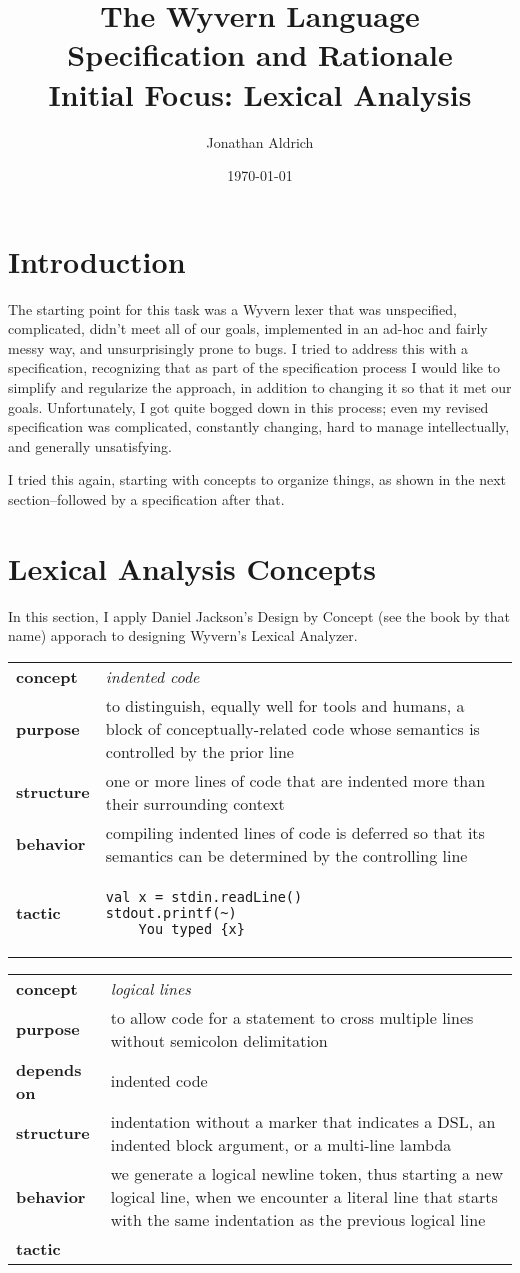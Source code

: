 \documentclass[11pt]{article}
\title{The Wyvern Language\\
Specification and Rationale\\
Initial Focus: Lexical Analysis}
\author{Jonathan Aldrich}
\date{\today}
\newcommand{\concept}[1]{
\noindent\vspace{2ex}
\begin{tabular}{p{0.8in}p{5.7in}}
\textbf{concept} & \textit{#1}\\
}
\newcommand{\purpose}[1]{
\textbf{purpose} & #1\\
}
\newcommand{\structure}[1]{
\textbf{structure} & #1\\
}
\newcommand{\behavior}[1]{
\textbf{behavior} & #1\\
}
\newcommand{\dependsOn}[1]{
\textbf{depends on} & #1\\
}
\newcommand{\tacticStart}[1]{
\textbf{tactic} & #1
}
\newcommand{\conceptFour}[4]{
\noindent\vspace{2ex}
\begin{tabular}{p{0.8in}p{5.7in}}
\textbf{concept} & \textit{#1}\\
\textbf{purpose} & #2\\
\textbf{structure} & #3\\
\textbf{behavior} & #4\\
\textbf{tactic} &
}
\newcommand{\conceptEnd}{
\end{tabular}
\vspace{2ex}
}
\begin{document}
\begin{sloppypar}

\maketitle

\section{Introduction}

The starting point for this task was a Wyvern lexer that was unspecified, complicated, didn't meet all of our goals, implemented in an ad-hoc and fairly messy way, and unsurprisingly prone to bugs.  I tried to address this with a specification, recognizing that as part of the specification process I would like to simplify and regularize the approach, in addition to changing it so that it met our goals.  Unfortunately, I got quite bogged down in this process; even my revised specification was complicated, constantly changing, hard to manage intellectually, and generally unsatisfying.

I tried this again, starting with concepts to organize things, as shown in the next section--followed by a specification after that.

\section{Lexical Analysis Concepts}

In this section, I apply Daniel Jackson's Design by Concept (see the book by that name) apporach to designing Wyvern's Lexical Analyzer.

\conceptFour{indented code}
{to distinguish, equally well for tools and humans, a block of conceptually-related code whose semantics is controlled by the prior line}
{one or more lines of code that are indented more than their surrounding context}
{compiling indented lines of code is deferred so that its semantics can be determined by the controlling line}
\begin{lstlisting}
val x = stdin.readLine()
stdout.printf(~)
    You typed {x}
\end{lstlisting}
\conceptEnd

\concept{logical lines}
\purpose{to allow code for a statement to cross multiple lines without semicolon delimitation}
\dependsOn{indented code}
\structure{indentation without a marker that indicates a DSL, an indented block argument, or a multi-line lambda}
\behavior{we generate a logical newline token, thus starting a new logical line, when we encounter a literal line that starts with the same indentation as the previous logical line}
\tacticStart
\begin{lstlisting}
val x = y.foo()
         .bar()
\end{lstlisting}
\conceptEnd


\end{sloppypar}
\end{document}
